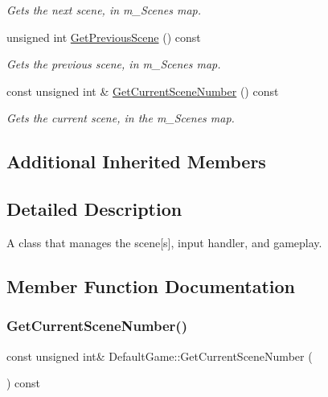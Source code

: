 \begin{DoxyCompactItemize}
\begin{DoxyCompactList}\small\item\em Gets the next scene, in m\+\_\+\+Scenes map. \end{DoxyCompactList}\item 
unsigned int \mbox{\hyperlink{class_default_game_a61dda5998f4587d654d7f651c5ed5d83}{Get\+Previous\+Scene}} () const
\begin{DoxyCompactList}\small\item\em Gets the previous scene, in m\+\_\+\+Scenes map. \end{DoxyCompactList}\item 
const unsigned int \& \mbox{\hyperlink{class_default_game_ad975018f66bb4006389fd238e11e6ba9}{Get\+Current\+Scene\+Number}} () const
\begin{DoxyCompactList}\small\item\em Gets the current scene, in the m\+\_\+\+Scenes map. \end{DoxyCompactList}\end{DoxyCompactItemize}
\subsection*{Additional Inherited Members}


\subsection{Detailed Description}
A class that manages the scene\mbox{[}s\mbox{]}, input handler, and gameplay. 

\subsection{Member Function Documentation}
\mbox{\label{class_default_game_ad975018f66bb4006389fd238e11e6ba9}} 
\subsubsection{\texorpdfstring{GetCurrentSceneNumber()}{GetCurrentSceneNumber()}}
{\footnotesize\ttfamily const unsigned int\& Default\+Game\+::\+Get\+Current\+Scene\+Number (\begin{DoxyParamCaption}{ }\end{DoxyParamCaption}) const\hspace{0.3cm}{\ttfamily [inline]}}



